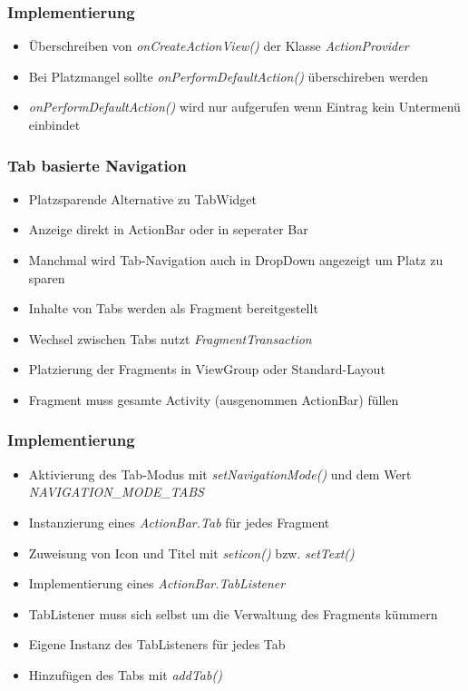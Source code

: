 \begin{frame}
   \frametitle{Implementierung}
   \begin{itemize}
      \item Überschreiben von \emph{onCreateActionView()} der Klasse \emph{ActionProvider}
      \item Bei Platzmangel sollte \emph{onPerformDefaultAction()} überschireben werden
      \item \emph{onPerformDefaultAction()} wird nur aufgerufen wenn Eintrag kein 
         Untermenü einbindet
   \end{itemize}

   
\end{frame}

\begin{frame}
   \frametitle{Tab basierte Navigation}
   \begin{itemize}
      \item Platzsparende Alternative zu TabWidget
      \item Anzeige direkt in ActionBar oder in seperater Bar
      \item Manchmal wird Tab-Navigation auch in DropDown angezeigt um 
         Platz zu sparen
      \item Inhalte von Tabs werden als Fragment bereitgestellt
      \item Wechsel zwischen Tabs nutzt \emph{FragmentTransaction}
      \item Platzierung der Fragments in ViewGroup oder Standard-Layout
      \item Fragment muss gesamte Activity (ausgenommen ActionBar) füllen
   \end{itemize}
\end{frame}

\begin{frame}
   \frametitle{Implementierung}
   \begin{itemize}
      \item Aktivierung des Tab-Modus mit \emph{setNavigationMode()} 
         und dem Wert \emph{NAVIGATION\_MODE\_TABS} 
      \item Instanzierung eines \emph{ActionBar.Tab} für jedes Fragment
      \item Zuweisung von Icon und Titel mit \emph{seticon()} bzw. \emph{setText()}
      \item Implementierung eines \emph{ActionBar.TabListener}
      \item TabListener muss sich selbst um die Verwaltung des Fragments kümmern
      \item Eigene Instanz des TabListeners für jedes Tab
      \item Hinzufügen des Tabs mit \emph{addTab()}
   \end{itemize}
\end{frame}


